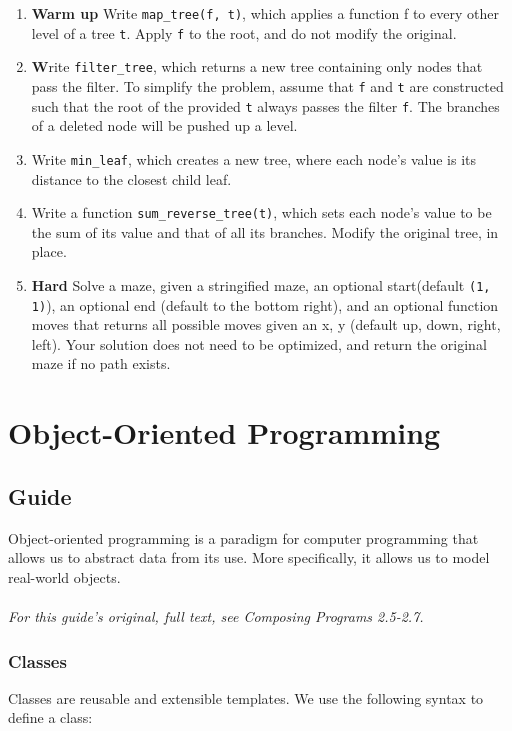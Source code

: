 \documentclass[a4paper]{book}
\begin{document}
\begin{enumerate}
\item \textbf{Warm up} Write {\tt map\_tree(f, t)}, which applies a function f to every other level of a tree {\tt t}. Apply {\tt f} to the root, and do not modify the original.
\item \textbf Write {\tt filter\_tree}, which returns a new tree containing only nodes that pass the filter. To simplify the problem, assume that {\tt f} and {\tt t} are constructed such that the root of the provided {\tt t} always passes the filter {\tt f}. The branches of a deleted node will be pushed up a level.
\item Write {\tt min\_leaf}, which creates a new tree, where each node's value is its distance to the closest child leaf.
\item Write a function {\tt sum\_reverse\_tree(t)}, which sets each node's value to be the sum of its value and that of all its branches. Modify the original tree, in place.
\item \textbf{Hard} Solve a maze, given a stringified maze, an optional start(default {\tt (1, 1)}), an optional end (default to the bottom right), and an optional function moves that returns all possible moves given an x, y (default up, down, right, left). Your solution does not need to be optimized, and return the original maze if no path exists.
\end{enumerate}

\chapter{Object-Oriented Programming}

\section{Guide}

Object-oriented programming is a paradigm for computer programming that allows us to abstract data from its use. More specifically, it allows us to model real-world objects. 
\\
\\
\textit{For this guide's original, full text, see Composing Programs 2.5-2.7.}

\subsection{Classes} 

Classes are reusable and extensible templates. We use the following syntax to define a class:
\end{document}
